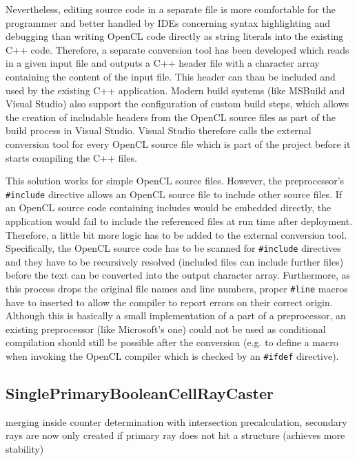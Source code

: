 Nevertheless, editing source code in a separate file is more comfortable for the programmer and better handled by IDEs concerning syntax highlighting and debugging than writing OpenCL code directly as string literals into the existing C++ code. Therefore, a separate conversion tool has been developed which reads in a given input file and outputs a C++ header file with a character array containing the content of the input file. This header can than be included and used by the existing C++ application. Modern build systems (like MSBuild and Visual Studio) also support the configuration of custom build steps, which allows the creation of includable headers from the OpenCL source files as part of the build process in Visual Studio. Visual Studio therefore calls the external conversion tool for every OpenCL source file which is part of the project before it starts compiling the C++ files.

This solution works for simple OpenCL source files. However, the preprocessor's \lstinline!#include! directive allows an OpenCL source file to include other source files. If an OpenCL source code containing includes would be embedded directly, the application would fail to include the referenced files at run time after deployment. Therefore, a little bit more logic has to be added to the external conversion tool. Specifically, the OpenCL source code has to be scanned for \lstinline!#include! directives and they have to be recursively resolved (included files can include further files) before the text can be converted into the output character array. Furthermore, as this process drops the original file names and line numbers, proper \lstinline!#line! macros have to inserted to allow the compiler to report errors on their correct origin. Although this is basically a small implementation of a part of a preprocessor, an existing preprocessor (like Microsoft's one) could not be used as conditional compilation should still be possible after the conversion (e.g. to define a macro when invoking the OpenCL compiler which is checked by an \lstinline!#ifdef! directive).


\subsection{SinglePrimaryBooleanCellRayCaster}

merging inside counter determination with intersection precalculation, secondary rays are now only created if primary ray does not hit a structure (achieves more stability)

